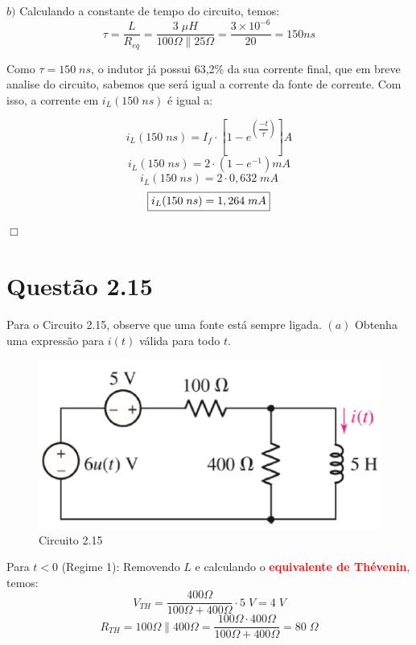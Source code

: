 \documentclass[
	12pt,				%
	oneside,			%
	a4paper,			%
	english,			%
	french,				%
	spanish,			%
	brazil				%
	]{abntex2}
\begin{document}
\newpage
$b)$ Calculando a constante de tempo do circuito, temos:
$$ \tau = \dfrac{L}{R_{eq}} = \dfrac{3 \;\mu H}{100 \Omega \parallel 25 \Omega} = \dfrac{3 \times 10^{-6}}{20} = 150 ns$$

Como $\tau=150\;ns$, o indutor já possui 63,2\% da sua corrente final, que em breve analise do circuito, sabemos que será igual a corrente da fonte de corrente. Com isso, a corrente em $i_L{(150\;ns)}$ é igual a:

$$i_L{(150\;ns)} = I_f \cdot [1-e^{\left(\dfrac{-t}{\tau}\right)}]A$$
$$i_L{(150\;ns)} = 2 \cdot (1-e^{-1})mA$$
$$i_L{(150\;ns)} = 2 \cdot 0,632 \; mA$$
\begin{equation}
    \centering
    \fbox{$i_L{(150\;ns)} = 1,264 \; mA$}
\end{equation}

\begin{flushright}
    $\Box$
\end{flushright}
\newpage

\section*{Questão 2.15}
Para o Circuito 2.15, observe que uma fonte está sempre ligada. $(a)$ Obtenha uma expressão para $i(t)$ válida para todo $t$.

\begin{figure}[htb]
	\centering
	\includegraphics[scale=0.60]{2-15.PNG}
	\caption{Circuito 2.15}
\end{figure}

Para $t<0$ (Regime 1):
Removendo $L$ e calculando o \textbf{\textcolor{red}{equivalente de Thévenin}}, temos:
$$V_{TH} = \dfrac{400\Omega}{100\Omega+400\Omega} \cdot 5\;V = 4\;V$$
$$R_{TH} = 100\Omega \parallel 400 \Omega = \dfrac{100\Omega \cdot 400\Omega}{100\Omega+400\Omega} = 80\;\Omega$$
\end{document}
